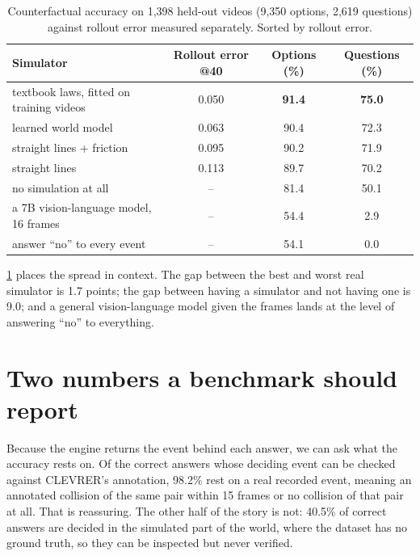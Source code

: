\documentclass[10pt,letterpaper]{article}
\begin{document}
\begin{table}[t]
\centering\small
\setlength{\tabcolsep}{5pt}
\caption{Counterfactual accuracy on 1,398 held-out videos (9,350 options, 2,619 questions)
against rollout error measured separately. Sorted by rollout error.}
\label{tab:sims}
\begin{tabular}{@{}lccc@{}}
\toprule
Simulator & Rollout error @40 & Options (\%) & Questions (\%) \\
\midrule
textbook laws, fitted on training videos & 0.050 & \textbf{91.4} & \textbf{75.0} \\
learned world model & 0.063 & 90.4 & 72.3 \\
straight lines + friction & 0.095 & 90.2 & 71.9 \\
straight lines & 0.113 & 89.7 & 70.2 \\
\midrule
no simulation at all & -- & 81.4 & 50.1 \\
a 7B vision-language model, 16 frames & -- & 54.4 & 2.9 \\
answer ``no'' to every event & -- & 54.1 & 0.0 \\
\bottomrule
\end{tabular}
\vspace{-2.5ex}
\end{table}

\cref{tab:sims} places the spread in context. The gap between the best and worst real
simulator is 1.7 points; the gap between having a simulator and not having one is 9.0; and a
general vision-language model given the frames lands at the level of answering ``no'' to
everything.

\vspace{-0.5ex}
\section{Two numbers a benchmark should report}
\vspace{-0.5ex}

Because the engine returns the event behind each answer, we can ask what the accuracy rests
on. Of the correct answers whose deciding event can be checked against CLEVRER's annotation,
98.2\% rest on a real recorded event, meaning an annotated collision of the same pair within
15 frames or no collision of that pair at all. That is reassuring. The other half of the
story is not: 40.5\% of correct answers are decided in the simulated part of the world, where
the dataset has no ground truth, so they can be inspected but never verified.
\end{document}
